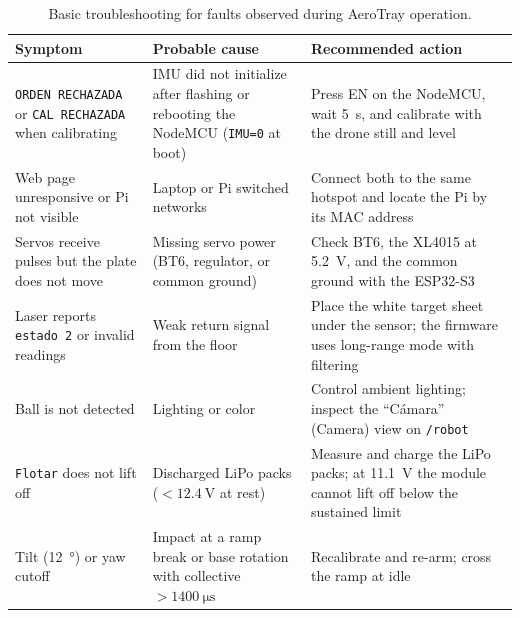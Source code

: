 \begin{table}[!htbp]
\centering
\caption{Basic troubleshooting for faults observed during AeroTray operation.}
\label{tab:troubleshooting}
\footnotesize
\begin{tabularx}{\textwidth}{@{}>{\raggedright\arraybackslash}p{}>{\raggedright\arraybackslash}p{}>{\raggedright\arraybackslash}X@{}}
\toprule
Symptom & Probable cause & Recommended action \\
\midrule
\texttt{ORDEN RECHAZADA} or \texttt{CAL RECHAZADA} when calibrating & IMU did not initialize after flashing or rebooting the NodeMCU (\texttt{IMU=0} at boot) & Press EN on the NodeMCU, wait \SI{5}{\second}, and calibrate with the drone still and level \\
Web page unresponsive or Pi not visible & Laptop or Pi switched networks & Connect both to the same hotspot and locate the Pi by its MAC address \\
Servos receive pulses but the plate does not move & Missing servo power (BT6, regulator, or common ground) & Check BT6, the XL4015 at \SI{5.2}{\volt}, and the common ground with the ESP32-S3 \\
Laser reports \texttt{estado 2} or invalid readings & Weak return signal from the floor & Place the white target sheet under the sensor; the firmware uses long-range mode with filtering \\
Ball is not detected & Lighting or color & Control ambient lighting; inspect the ``Cámara'' (Camera) view on \texttt{/robot} \\
\texttt{Flotar} does not lift off & Discharged LiPo packs ($<\SI{12.4}{\volt}$ at rest) & Measure and charge the LiPo packs; at \SI{11.1}{\volt} the module cannot lift off below the sustained limit \\
Tilt (\SI{12}{\degree}) or yaw cutoff & Impact at a ramp break or base rotation with collective $>\SI{1400}{\micro\second}$ & Recalibrate and re-arm; cross the ramp at idle \\
\bottomrule
\end{tabularx}
\end{table}
